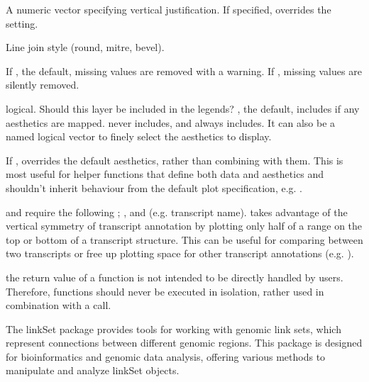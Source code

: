 \documentclass[letterpaper]{book}
\begin{document}
\begin{Arguments}
\begin{ldescription}
\begin{itemize}
\end{itemize}


\item[\code{vjust}] A numeric vector specifying vertical justification.
If specified, overrides the  setting.

\item[\code{linejoin}] Line join style (round, mitre, bevel).

\item[\code{na.rm}] If , the default, missing values are removed with
a warning. If , missing values are silently removed.

\item[\code{show.legend}] logical. Should this layer be included in the legends?
, the default, includes if any aesthetics are mapped.
 never includes, and  always includes.
It can also be a named logical vector to finely select the aesthetics to
display.

\item[\code{inherit.aes}] If , overrides the default aesthetics,
rather than combining with them. This is most useful for helper functions
that define both data and aesthetics and shouldn't inherit behaviour from
the default plot specification, e.g. .
\end{ldescription}
\end{Arguments}
%
\begin{Details}
 and  require the following ;
,  and  (e.g. transcript name).  takes
advantage of the vertical symmetry of transcript annotation by plotting only
half of a range on the top or bottom of a transcript structure. This can be
useful for comparing between two transcripts or free up plotting space for
other transcript annotations (e.g. ).
\end{Details}
%
\begin{Value}
the return value of a  function is not intended to be
directly handled by users. Therefore,  functions should never be
executed in isolation, rather used in combination with a
 call.
\end{Value}
%
\begin{Description}
The linkSet package provides tools for working with genomic link sets,
which represent connections between different genomic regions. This package
is designed for bioinformatics and genomic data analysis, offering various
methods to manipulate and analyze linkSet objects.
\end{Description}
\end{document}
